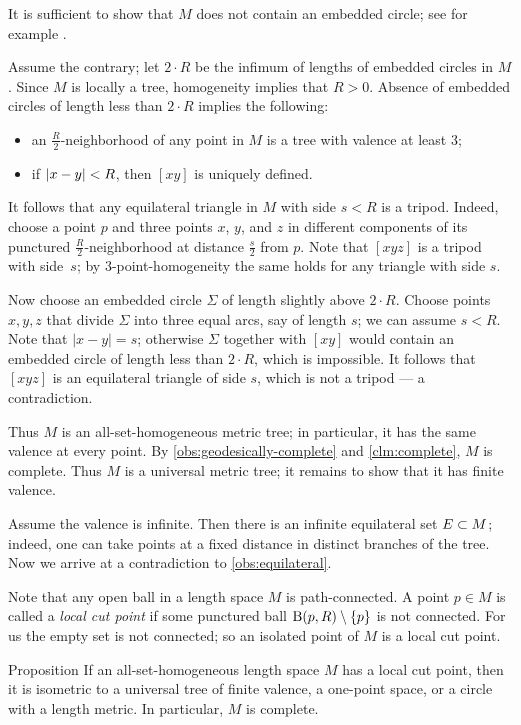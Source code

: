 \documentclass[a4paper,10pt]{article}
\begin{document}
It is sufficient to show that $M$ does not contain an embedded circle; see for example \cite[2.2.3]{chiswell}.

Assume the contrary; let $2\cdot R$ be the infimum of lengths of embedded circles in $M$.
Since $M$ is locally a tree, homogeneity implies that $R>0$.
Absence of embedded circles of length less than $2\cdot R$ implies the following:
\begin{itemize}
\item an $\tfrac R2$-neighborhood of any point in $M$ is a tree with valence at least $3$;
\item if $|x-y|\z<R$, then $[xy]$ is uniquely defined.
\end{itemize}

It follows that any equilateral triangle in $M$ with side $s<R$ is a tripod.
Indeed, choose a point $p$ and three points $x$, $y$, and $z$ in different components of its punctured $\tfrac R2$-neighborhood at distance $\tfrac s2$ from $p$.
Note that $[xyz]$ is a tripod with side~$s$;
by $3$-point-homogeneity the same holds for any triangle with side $s$.

Now choose an embedded circle $\Sigma$ of length slightly above $2\cdot R$.
Choose points $x,y,z$ that divide $\Sigma$ into three equal arcs, say of length $s$;
we can assume  $s<R$.
Note that $|x-y|=s$; otherwise $\Sigma$ together with $[xy]$ would contain an embedded circle of length less than $2\cdot R$,
which is impossible.
It follows that $[xyz]$ is an equilateral triangle of side $s$,
which is not a tripod --- a contradiction.

Thus $M$ is an all-set-homogeneous metric tree;
in particular, it has the same valence at every point.
By \ref{obs:geodesically-complete} and \ref{clm:complete}, $M$ is complete.
Thus $M$ is a universal metric tree;
it remains to show that it has finite valence.

Assume the valence is infinite.
Then there is an infinite equilateral set $E\z\subset M$;
indeed, one can take points at a fixed distance in distinct branches of the tree.
Now we arrive at a contradiction to \ref{obs:equilateral}.
\qeds

Note that any open ball in a length space $M$ is path-connected.
A point $p\in M$ is called a \emph{local cut point} if some punctured ball $\mathrm{B}(p,R)\setminus\{p\}$ is not connected.
For us the empty set is not connected; so an isolated point of $M$ is a local cut point.

\begin{thm}{Proposition}\label{prop:cut-point}
If an all-set-homogeneous length space $M$ has a local cut point,
then it is isometric to a universal tree of finite valence,
a one-point space,
or a circle with a length metric.
In particular, $M$ is complete.
\end{thm}
\end{document}
